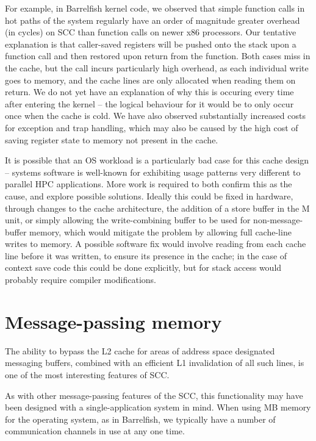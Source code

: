 \documentclass[a4paper,twoside]{report} %
\begin{document}
For example, in Barrelfish kernel code, we observed that simple
function calls in hot paths of the system regularly have an order of
magnitude greater overhead (in cycles) on SCC than function calls on
newer x86 processors. Our tentative explanation is that caller-saved
registers will be pushed onto the stack upon a function call and then
restored upon return from the function. Both cases miss in the cache,
but the call incurs particularly high overhead, as each individual
write goes to memory, and the cache lines are only allocated when
reading them on return. We do not yet have an explanation of why this
is occuring every time after entering the kernel -- the logical
behaviour for it would be to only occur once when the cache is
cold. We have also observed substantially increased costs for
exception and trap handling, which may also be caused by the high cost
of saving register state to memory not present in the cache.

It is possible that an OS workload is a particularly bad case for this
cache design -- systems software is well-known for exhibiting usage
patterns very different to parallel HPC applications.
More work is required to both confirm this as the cause, and explore possible
solutions. Ideally this could be fixed in hardware, through changes to the
cache architecture, the addition of a store buffer in the M unit, or simply
allowing the write-combining buffer to be used for non-message-buffer memory,
which would mitigate the problem by allowing full cache-line writes to memory.
A possible software fix would involve reading from each cache line before it
was written, to ensure its presence in the cache; in the case of context save
code this could be done explicitly, but for stack access would probably
require compiler modifications.

\section{Message-passing memory}

The ability to bypass the L2 cache for areas of address space
designated messaging buffers, combined with an efficient L1
invalidation of all such lines, is one of the most interesting
features of SCC. 

As with other message-passing features of the SCC, this functionality
may have been designed with a single-application system in mind.  When
using MB memory for the operating system, as in Barrelfish, we
typically have a number of communication channels in use at any one
time. 
\end{document}
